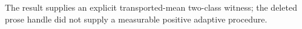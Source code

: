 The result supplies an explicit transported-mean two-class witness; the deleted prose handle did not supply a measurable positive adaptive procedure.
